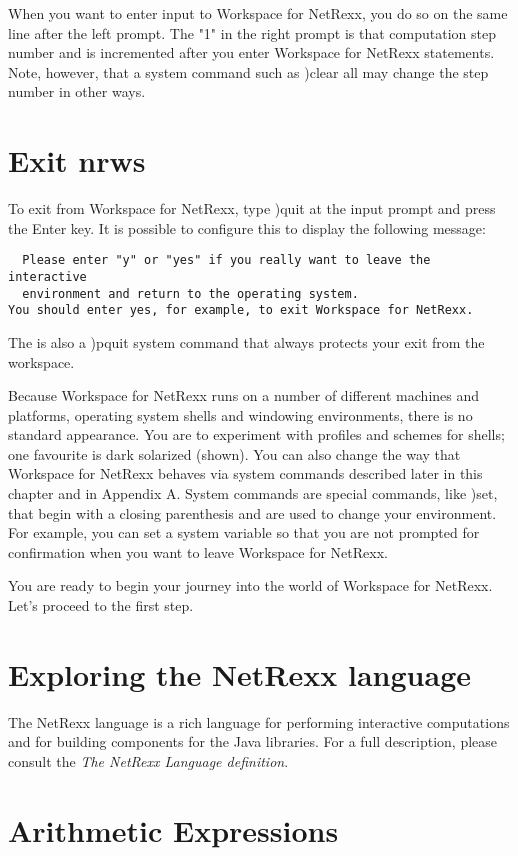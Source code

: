 
When you want to enter input to Workspace for NetRexx, you do so on the same line after the left prompt. The "1" in the right prompt is that computation step number and is incremented after you enter Workspace for NetRexx statements. Note, however, that a system command such as )clear all may change the step number in other ways.

\section{Exit nrws}
To exit from Workspace for NetRexx, type )quit at the input prompt and press the Enter key. It is possible to configure this to display the following message:
\begin{verbatim}
  Please enter "y" or "yes" if you really want to leave the interactive
  environment and return to the operating system.
You should enter yes, for example, to exit Workspace for NetRexx.
\end{verbatim}
The is also a )pquit system command that always protects your exit from the workspace.

Because Workspace for NetRexx runs on a number of different machines and platforms, operating system shells and windowing environments, there is no standard appearance. You are to experiment with profiles and schemes for shells; one favourite is dark solarized (shown). You can also change the way that Workspace for NetRexx behaves via system commands described later in this chapter and in Appendix A. System commands are special commands, like )set, that begin with a closing parenthesis and are used to change your environment. For example, you can set a system variable so that you are not prompted for confirmation when you want to leave Workspace for NetRexx.

You are ready to begin your journey into the world of Workspace for NetRexx. Let's proceed to the first step.

 \section{Exploring the NetRexx language}

The NetRexx language is a rich language for performing interactive
computations and for building components for the Java libraries. For a
full description, please consult the \emph{The NetRexx Language definition}.

 \section{Arithmetic Expressions}

